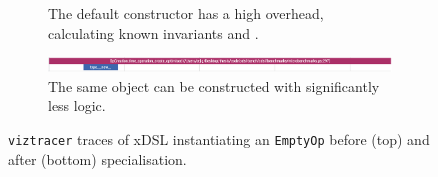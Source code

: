 \begin{figure}[H]
    \centering
    \begin{subfigure}[b]{\textwidth}
        \centering
        \captionsetup{width=0.8\textwidth}
        \caption{The default constructor has a high overhead, calculating known invariants and .}
        \label{fig:ubenchmark-original-instantiation-xdsl-viztracer}
    \end{subfigure}
    \begin{subfigure}[b]{\textwidth}
        \centering
        \includegraphics[width=\textwidth]{images/specialising_optimising_xdsl_rewriting/optimised_empty_create}
        \captionsetup{width=0.8\textwidth}
        \caption{The same object can be constructed with significantly less logic.}
        \label{fig:ubenchmark-optimised-instantiation-xdsl-viztracer}
    \end{subfigure}
    \caption{\texttt{viztracer} traces of xDSL instantiating an \texttt{EmptyOp} before (top) and after (bottom) specialisation.}
    \label{fig:ubenchmark-instantiation-xdsl-viztracer}
\end{figure}

